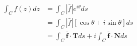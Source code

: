 \documentclass[preview]{standalone}
\begin{document}
\begin{center}
\begin{align*} \int_{C} f(z) dz &= \int_{C} |\bar{f}|e^{i\theta}ds \\ &= \int_{C} |\bar{f}|\left[ \cos{\theta} + i\sin{\theta} \right]ds \\ &= \int_{C} \boldsymbol{\bar{f} \cdot T} ds + i\int_{C} \boldsymbol{\bar{f} \cdot N} ds \end{align*}
\end{center}
\end{document}
